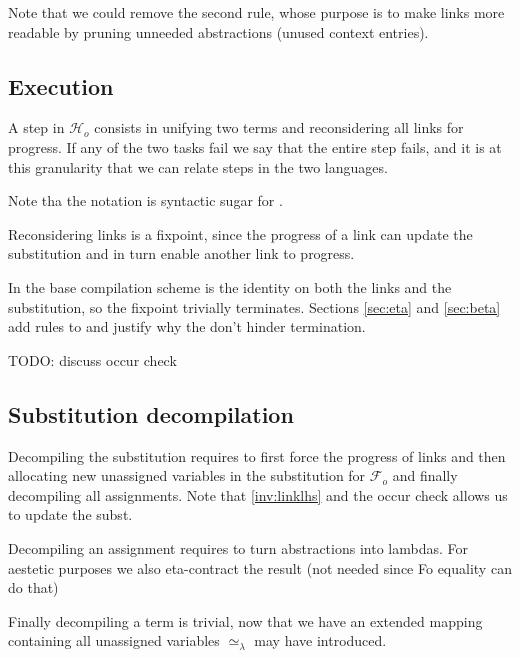 \documentclass[sigconf,natbib=false,review]{acmart}
\newcommand{\UnifRel}{\ensuremath{\simeq}}
\newcommand{\Ue}{\ensuremath{\UnifRel_\lambda}\xspace}
\newcommand{\Fo}{\ensuremath{\mathcal{F}_{\!o}\xspace}} %
\newcommand{\Ho}{\ensuremath{\mathcal{H}_o}\xspace}
\begin{document}


\noindent
Note that we could remove the second rule, whose purpose is to make
links more readable by pruning unneeded abstractions (unused context entries).

\subsection{Execution}

A step in \Ho consists in unifying two terms and reconsidering all
links for progress. If any of the two tasks fail we say that the entire step
fails, and it is at this granularity that we can relate steps in the
two languages.




\noindent
Note tha the notation \elpiIn{((A ~\Ue~B) C D)} is syntactic sugar for
\elpiIn{((~\Ue~) A B C D)}.

Reconsidering links is a fixpoint, since the progress of a link can update the
substitution and in turn enable another link to progress.



\noindent
In the base compilation scheme  is the identity
on both the links and the substitution, so the fixpoint trivially terminates.
Sections \ref{sec:eta} and \ref{sec:beta} add rules to 
and justify why the don't hinder termination.

TODO: discuss occur check

\subsection{Substitution decompilation}

Decompiling the substitution requires to first force the
progress of links and then allocating new unassigned variables
in the substitution for \Fo{} and finally decompiling all
assignments. Note that \ref{inv:linklhs} and the
occur check allows us to update the subst.




\noindent
Decompiling an assignment requires to turn abstractions into
lambdas. For aestetic purposes we also eta-contract the result
(not needed since Fo equality can do that)



\noindent
Finally decompiling a term is trivial, now that we have an extended
mapping containing all unassigned variables \Ue may have introduced.
\end{document}
